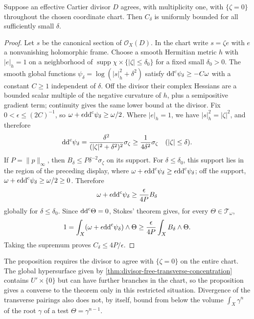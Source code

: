 \begin{proposition}\label{prop:cartier-transverse-concentration-bound}
Suppose an effective Cartier divisor $D$ agrees, with multiplicity one, with $\{\zeta=0\}$ throughout the chosen coordinate chart. Then $C_\delta$ is uniformly bounded for all sufficiently small $\delta$.
\end{proposition}
\begin{proof}
Let $s$ be the canonical section of $\mathcal O_X(D)$. In the chart write $s=\zeta e$ with $e$ a nonvanishing holomorphic frame. Choose a smooth Hermitian metric $h$ with $|e|_h=1$ on a neighborhood of $\operatorname{supp}\chi\times\{|\zeta|\leq\delta_0\}$ for a fixed small $\delta_0>0$.
The smooth global functions $\psi_\delta=\log(|s|_h^2+\delta^2)$ satisfy $\mathrm{dd}^{\mathrm{c}}\psi_\delta\geq-C\omega$ with a constant $C\geq1$ independent of $\delta$. Off the divisor their complex Hessians are a bounded scalar multiple of the negative curvature of $h$, plus a semipositive gradient term; continuity gives the same lower bound at the divisor. Fix $0<\epsilon\leq(2C)^{-1}$, so $\omega+\epsilon\mathrm{dd}^{\mathrm{c}}\psi_\delta\geq\omega/2$.
Where $|e|_h=1$, we have $|s|_h^2=|\zeta|^2$, and therefore
\[
 \mathrm{dd}^{\mathrm{c}}\psi_\delta
 =\frac{\delta^2}{(|\zeta|^2+\delta^2)^2}\sigma_\zeta
 \geq\frac1{4\delta^2}\sigma_\zeta
 \quad(|\zeta|\leq\delta).
\]
If $P=\|p\|_\infty$, then $B_\delta\leq P\delta^{-2}\sigma_\zeta$ on its support. For $\delta\leq\delta_0$, this support lies in the region of the preceding display, where $\omega+\epsilon\mathrm{dd}^{\mathrm{c}}\psi_\delta\geq\epsilon\mathrm{dd}^{\mathrm{c}}\psi_\delta$; off the support, $\omega+\epsilon\mathrm{dd}^{\mathrm{c}}\psi_\delta\geq\omega/2\geq0$. Therefore
\[
 \omega+\epsilon\mathrm{dd}^{\mathrm{c}}\psi_\delta\geq\frac{\epsilon}{4P}B_\delta
\]
globally for $\delta\leq\delta_0$. Since $\mathrm{dd}^{\mathrm{c}}\Theta=0$, Stokes' theorem gives, for every $\Theta\in\mathcal T_\omega$,
\[
 1=\int_X(\omega+\epsilon\mathrm{dd}^{\mathrm{c}}\psi_\delta)\wedge\Theta
      \geq\frac{\epsilon}{4P}\int_XB_\delta\wedge\Theta.
\]
Taking the supremum proves $C_\delta\leq4P/\epsilon$.
\end{proof}

The proposition requires the divisor to agree with $\{\zeta=0\}$ on the entire chart. The global hypersurface given by \cref{thm:divisor-free-transverse-concentration} contains $U'\times\{0\}$ but can have further branches in the chart, so the proposition gives a converse to the theorem only in this restricted situation. Divergence of the transverse pairings also does not, by itself, bound from below the volume $\int_X\gamma^n$ of the root $\gamma$ of a test $\Theta=\gamma^{n-1}$.

